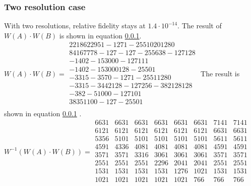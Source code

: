 \documentclass{article}
\begin{document}
\subsubsection {Two resolution case}
With two resolutions, relative fidelity stays at  $1.4 \cdot 10^{-14}$.  The result of $W(A)\cdot  W(B)$ is shown in equation \ref{}.\\
$ W(A) \cdot W(B) =
\begin{array}{cccccccc}
22186 22951 -127 1 -255 1020 128 0\\
8416 7778 -127 -127 -255 638 -127 128\\
-1402 -1530 0 0 -127 1 1 1\\
-1402 -1530 0 0 128 -255 0 1\\
-3315 -3570 -127 1 -255 1 128 0\\
-3315 -3442 128 -127 256 -382 128 128\\
-382 -510 0 0 -127 1 0 1\\
383 511 0 0 -127 -255 0 1\\
\end{array}
$
The result is shown in equation \ref{} .\\
$ W^{-1}(W(A) \cdot W(B)) =
\begin{array}{cccccccc}
6631 & 6631 & 6631 & 6631 & 6631 & 6631 & 7141 & 7141\\
6121 & 6121 & 6121 & 6121 & 6121 & 6121 & 6631 & 6631\\
5356 & 5101 & 5101 & 5101 & 5101 & 5101 & 5611 & 5611\\
4591 & 4336 & 4081 & 4081 & 4081 & 4081 & 4591 & 4591\\
3571 & 3571 & 3316 & 3061 & 3061 & 3061 & 3571 & 3571\\
2551 & 2551 & 2551 & 2296 & 2041 & 2041 & 2551 & 2551\\
1531 & 1531 & 1531 & 1531 & 1276 & 1021 & 1531 & 1531\\
1021 & 1021 & 1021 & 1021 & 1021 & 766 & 766 & 766\\
\end{array}
$
\end{document}
